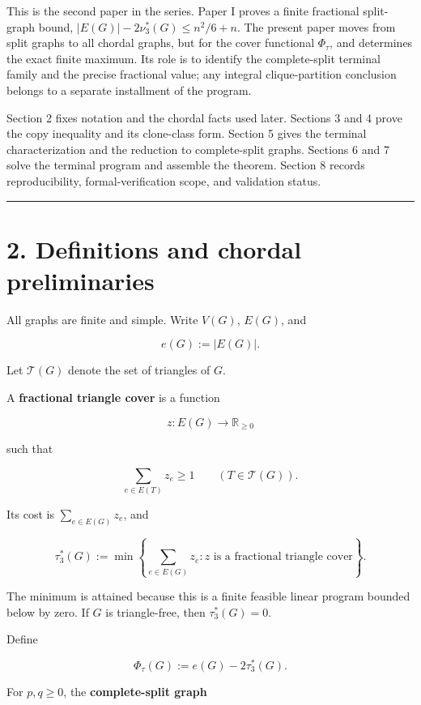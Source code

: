 \documentclass[
  11pt,
]{article}
\begin{document}
This is the second paper in the series. Paper I proves a finite
fractional split-graph bound, \(|E(G)|-2\nu_3^*(G)\le n^2/6+n\). The
present paper moves from split graphs to all chordal graphs, but for the
cover functional \(\Phi_\tau\), and determines the exact finite maximum.
Its role is to identify the complete-split terminal family and the
precise fractional value; any integral clique-partition conclusion
belongs to a separate installment of the program.

Section 2 fixes notation and the chordal facts used later. Sections 3
and 4 prove the copy inequality and its clone-class form. Section 5
gives the terminal characterization and the reduction to complete-split
graphs. Sections 6 and 7 solve the terminal program and assemble the
theorem. Section 8 records reproducibility, formal-verification scope,
and validation status.

\begin{center}\rule{0.5\linewidth}{0.5pt}\end{center}

\section{2. Definitions and chordal
preliminaries}\label{definitions-and-chordal-preliminaries}

All graphs are finite and simple. Write \(V(G)\), \(E(G)\), and

\[
e(G):=|E(G)|.
\]

Let \(\mathcal T(G)\) denote the set of triangles of \(G\).

A \textbf{fractional triangle cover} is a function

\[
z:E(G)\longrightarrow\mathbb R_{\ge0}
\]

such that

\[
\sum_{e\in E(T)}z_e\ge1
\qquad
(T\in\mathcal T(G)).
\]

Its cost is \(\sum_{e\in E(G)}z_e\), and

\[
\tau_3^*(G)
:=
\min\left\{
\sum_{e\in E(G)}z_e:
z\text{ is a fractional triangle cover}
\right\}.
\]

The minimum is attained because this is a finite feasible linear program
bounded below by zero. If \(G\) is triangle-free, then
\(\tau_3^*(G)=0\).

Define

\[
\Phi_\tau(G):=e(G)-2\tau_3^*(G).
\]

For \(p,q\ge0\), the \textbf{complete-split graph}
\end{document}
